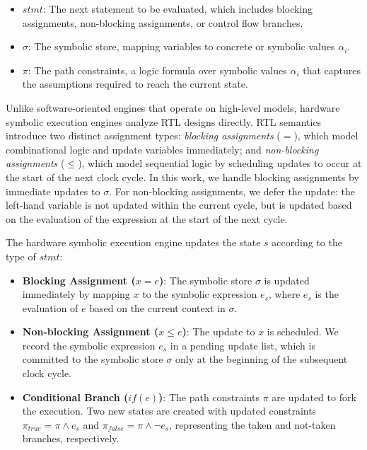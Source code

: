 \documentclass[conference]{IEEEtran}
\begin{document}
\begin{itemize}
    \item \textbf{$stmt$}: The next statement to be evaluated, which includes blocking assignments, non-blocking assignments, or control flow branches.
    \item \textbf{$\sigma$}: The symbolic store, mapping variables to concrete or symbolic values $\alpha_i$.
    \item \textbf{$\pi$}: The path constraints, a logic formula over symbolic values $\alpha_i$ that captures the assumptions required to reach the current state.
\end{itemize}

Unlike software-oriented engines that operate on high-level models, hardware symbolic execution engines analyze RTL designs directly. RTL semantics introduce two distinct assignment types: \textit{blocking assignments} ($=$), which model combinational logic and update variables immediately; and \textit{non-blocking assignments} ($\le$), which model sequential logic by scheduling updates to occur at the start of the next clock cycle. In this work, we handle blocking assignments by immediate updates to $\sigma$. For non-blocking assignments, we defer the update: the left-hand variable is not updated within the current cycle, but is updated based on the evaluation of the expression at the start of the next cycle.

The hardware symbolic execution engine updates the state $s$ according to the type of $stmt$:

\begin{itemize}[leftmargin=1.5em, itemsep=4pt, topsep=2pt]
    \item \textbf{Blocking Assignment ($x = e$)}: The symbolic store $\sigma$ is updated immediately by mapping $x$ to the symbolic expression $e_s$, where $e_s$ is the evaluation of $e$ based on the current context in $\sigma$.
    \item \textbf{Non-blocking Assignment ($x \le e$)}: The update to $x$ is scheduled. We record the symbolic expression $e_s$ in a pending update list, which is committed to the symbolic store $\sigma$ only at the beginning of the subsequent clock cycle.
    \item \textbf{Conditional Branch ($if(e)$)}: The path constraints $\pi$ are updated to fork the execution. Two new states are created with updated constraints $\pi_{true} = \pi \land e_s$ and $\pi_{false} = \pi \land \neg e_s$, representing the taken and not-taken branches, respectively.
\end{itemize}
\end{document}
